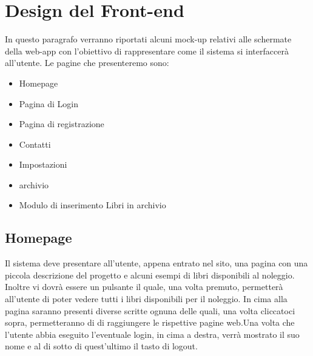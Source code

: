 \documentclass{article}
\begin{document}
\section{Design del Front-end}
In questo paragrafo verranno riportati alcuni mock-up relativi alle schermate della web-app con l’obiettivo di rappresentare come il sistema si interfaccerà all’utente. Le pagine che presenteremo sono:
    \begin{itemize}
        \item Homepage
        \item Pagina di Login
        \item Pagina di registrazione
        \item Contatti
        \item Impostazioni
        \item archivio
        \item Modulo di inserimento Libri in archivio
    \end{itemize}
\subsection{Homepage}
Il sistema deve presentare all’utente, appena entrato nel sito, una pagina con una piccola descrizione del progetto e alcuni esempi di libri disponibili al noleggio. Inoltre vi dovrà essere un pulsante il quale, una volta premuto, permetterà all’utente di poter vedere tutti i libri disponibili per il noleggio. In cima alla pagina saranno presenti diverse scritte ognuna delle quali, una volta cliccatoci sopra, permetteranno di di raggiungere le rispettive pagine web.Una volta che l’utente abbia eseguito l’eventuale login, in cima a destra, verrà mostrato il suo nome e al di sotto di quest’ultimo il tasto di logout.
\end{document}
